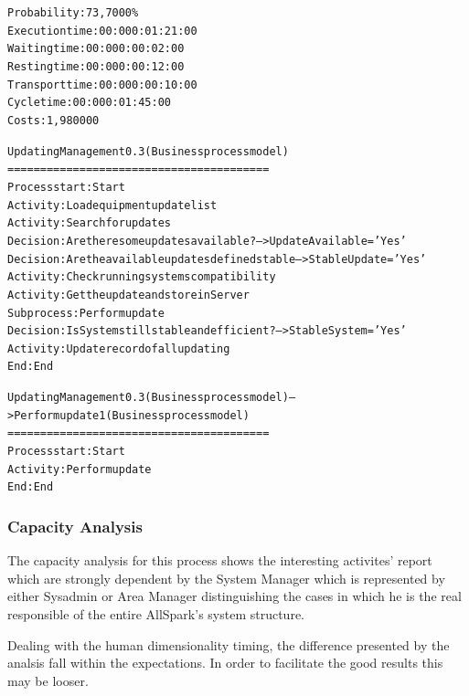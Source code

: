 \begin{alltt}
Probability:   73,7000\%
Execution time:  00:000:01:21:00
Waiting time:  00:000:00:02:00
Resting time:  00:000:00:12:00
Transport time:  00:000:00:10:00
Cycle time:  00:000:01:45:00
Costs:  1,980000

Updating Management 0.3 (Business process model)
========================================
Process start: Start
Activity: Load equipment update list
Activity: Search for updates
Decision: Are there some updates available? --> UpdateAvailable='Yes'
Decision: Are the available updates defined stable --> StableUpdate='Yes'
Activity: Check running systems compatibility
Activity: Get the update and store in Server
Subprocess: Perform update
Decision: Is System still stable and efficient? --> StableSystem='Yes'
Activity: Update record of all updating
End: End

Updating Management 0.3 (Business process model) --> Perform update 1 (Business process model)
========================================
Process start: Start
Activity: Perform update
End: End
\end{alltt}


\subsubsection{Capacity Analysis}
The capacity analysis for this process shows the interesting activites' report which are strongly dependent by the System Manager which is represented by either Sysadmin or Area Manager distinguishing the cases in which he is the real responsible of the entire AllSpark's system structure.

Dealing with the human dimensionality timing, the difference presented by the analsis fall within the expectations. In order to facilitate the good results this may be looser.

